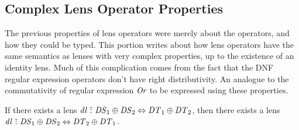 \documentclass[acmsmall]{acmart}
\begin{document}
\subsection{Complex Lens Operator Properties}
\label{complex-lens-operators}

The previous properties of lens operators were merely about the operators, and
how they could be typed.  This portion writes about how lens operators have the
same semantics as lenses with
very complex properties, up to the existence of an identity lens.  Much of this
complication comes from the fact that the DNF regular expression operators don't
have right distributivity.  An analogue to the
commutativity of regular expression $\textit{Or}$ to be expressed using these
properties.

\begin{lemma}
  \label{lem:or-dnf-commutativity}
  If there exists a lens $\mathit{dl} \,\,\tilde{:}\,\, \mathit{DS}_1 \oplus \mathit{DS}_2
  \Leftrightarrow \mathit{DT}_1 \oplus \mathit{DT}_2$, then there exists a
  lens
  $\mathit{dl} \,\,\tilde{:}\,\, \mathit{DS}_1 \oplus \mathit{DS}_2
  \Leftrightarrow \mathit{DT}_2 \oplus \mathit{DT}_1$.
\end{lemma}
\end{document}
